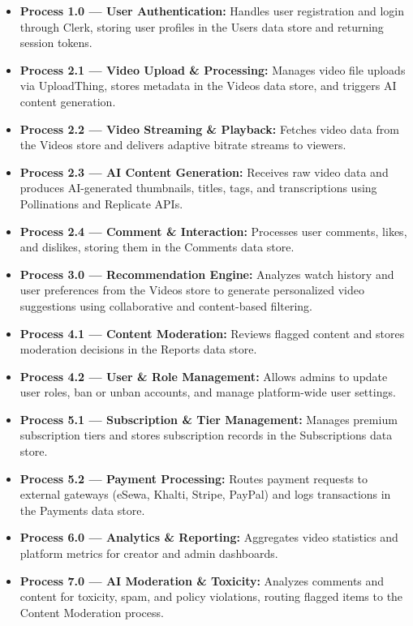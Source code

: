 \begin{itemize}[leftmargin=2cm]
  \item \textbf{Process 1.0 --- User Authentication:} Handles user registration and login through Clerk, storing user profiles in the Users data store and returning session tokens.
  \item \textbf{Process 2.1 --- Video Upload \& Processing:} Manages video file uploads via UploadThing, stores metadata in the Videos data store, and triggers AI content generation.
  \item \textbf{Process 2.2 --- Video Streaming \& Playback:} Fetches video data from the Videos store and delivers adaptive bitrate streams to viewers.
  \item \textbf{Process 2.3 --- AI Content Generation:} Receives raw video data and produces AI-generated thumbnails, titles, tags, and transcriptions using Pollinations and Replicate APIs.
  \item \textbf{Process 2.4 --- Comment \& Interaction:} Processes user comments, likes, and dislikes, storing them in the Comments data store.
  \item \textbf{Process 3.0 --- Recommendation Engine:} Analyzes watch history and user preferences from the Videos store to generate personalized video suggestions using collaborative and content-based filtering.
  \item \textbf{Process 4.1 --- Content Moderation:} Reviews flagged content and stores moderation decisions in the Reports data store.
  \item \textbf{Process 4.2 --- User \& Role Management:} Allows admins to update user roles, ban or unban accounts, and manage platform-wide user settings.
  \item \textbf{Process 5.1 --- Subscription \& Tier Management:} Manages premium subscription tiers and stores subscription records in the Subscriptions data store.
  \item \textbf{Process 5.2 --- Payment Processing:} Routes payment requests to external gateways (eSewa, Khalti, Stripe, PayPal) and logs transactions in the Payments data store.
  \item \textbf{Process 6.0 --- Analytics \& Reporting:} Aggregates video statistics and platform metrics for creator and admin dashboards.
  \item \textbf{Process 7.0 --- AI Moderation \& Toxicity:} Analyzes comments and content for toxicity, spam, and policy violations, routing flagged items to the Content Moderation process.
\end{itemize}

